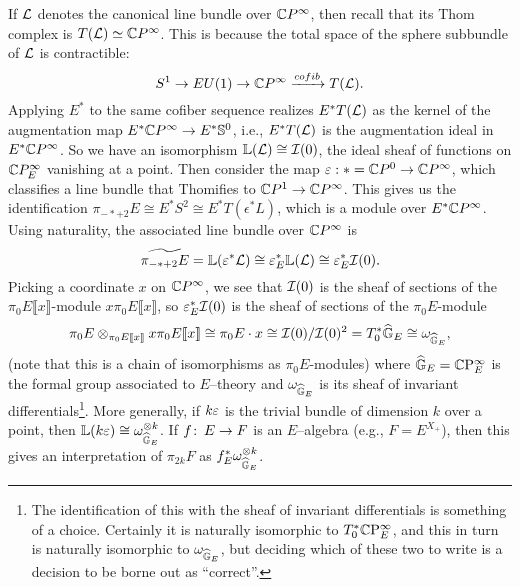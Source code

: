 \begin{example}
If $\mathcal{L}$ denotes the canonical line bundle over $\mathbb{C} P^\infty$, then recall that its Thom complex is $T(\mathcal{L}) \simeq \mathbb{C} P^\infty$.  This is because the total space of the sphere subbundle of $\mathcal{L}$ is contractible: \[ S^1 \rightarrow EU(1) \rightarrow \mathbb{C} P^\infty \xrightarrow{cofib} T(\mathcal{L}). \]  Applying $E^*$ to the same cofiber sequence realizes $E^* T(\mathcal{L})$ as the kernel of the augmentation map $E^* \mathbb{C} P^\infty \to E^* \mathbb S^0$, i.e., $E^* T(\mathcal{L})$ is the augmentation ideal in $E^* \mathbb{C} P^\infty$.  So we have an isomorphism $\mathbb{L}(\mathcal{L}) \cong \mathcal{I} (0)$, the ideal sheaf of functions on $\mathbb{C} P^\infty_E$ vanishing at a point.  Then consider the map $\varepsilon: * = \mathbb{C} P^0 \to \mathbb{C} P^\infty$, which classifies a line bundle that Thomifies to $\mathbb{C} P^1 \to \mathbb{C} P^\infty$.  This gives us the identification $\pi_{-*+2} E \cong E^* S^2 \cong E^* T(\epsilon^* L)$, which is a module over $E^* \mathbb{C} P^\infty$.  Using naturality, the associated line bundle over $\mathbb{C} P^\infty$ is \[\widetilde{\pi_{-*+2} E} = \mathbb{L}(\varepsilon^* \mathcal{L}) \cong \varepsilon_E^* \mathbb{L}(\mathcal{L}) \cong \varepsilon_E^* \mathcal{I} (0).\] Picking a coordinate $x$ on $\mathbb{C} P^\infty$, we see that $\mathcal{I}(0)$ is the sheaf of sections of the $\pi_0 E \llbracket x \rrbracket$-module $x \pi_0 E \llbracket x \rrbracket$, so $\varepsilon_E^* \mathcal{I}(0)$ is the sheaf of sections of the $\pi_0 E$-module \[\pi_0 E \otimes_{\pi_0 E \llbracket x \rrbracket} x \pi_0 E \llbracket x \rrbracket \cong \pi_0 E \cdot x \cong \mathcal{I}(0)/\mathcal{I}(0)^2 = T_0^* \widehat{\mathbb G}_E \cong \omega_{\widehat{\mathbb G}_E}, \] (note that this is a chain of isomorphisms as $\pi_0 E$-modules) where $\widehat{\mathbb G}_E = \mathbb{C}\mathrm P^\infty_E$ is the formal group associated to $E$--theory and $\omega_{\widehat{\mathbb G}_E}$ is its sheaf of invariant differentials\footnote{The identification of this with the sheaf of invariant differentials is something of a choice.  Certainly it is naturally isomorphic to $T_0^* \mathbb{C}\mathrm P^\infty_E$, and this in turn is naturally isomorphic to $\omega_{\widehat{\mathbb G}_E}$, but deciding which of these two to write is a decision to be borne out as ``correct''.}.  More generally, if $k \varepsilon$  is the trivial bundle of dimension $k$ over a point, then $\mathbb{L}(k \varepsilon) \cong \omega_{\widehat{\mathbb G}_E}^{\otimes k}$.  If $f \colon\thinspace E \to F$ is an $E$--algebra (e.g., $F = E^{X_+}$), then this gives an interpretation of $\pi_{2k} F$ as $f_E^* \omega_{\widehat{\mathbb G}_E}^{\otimes k}$.
\end{example}

